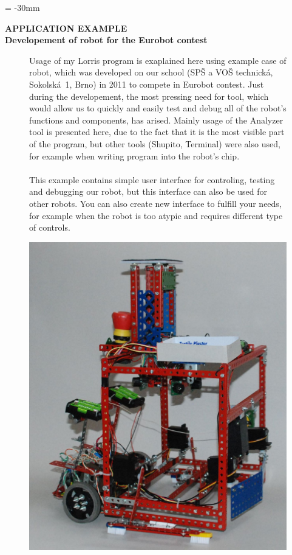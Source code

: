 \documentclass[17pt]{extreport}
\newcommand{\B}{\textbf} %
\begin{document}
\newpage
\voffset = -30mm %
\begin{center}
    \Large \B{APPLICATION EXAMPLE \\Developement of robot for the Eurobot contest}
\end{center}
\vspace{5mm}
\enlargethispage{200mm} %
\begin{figure}[ht]
    \begin{minipage}[t]{0.48\linewidth}
Usage of my Lorris program is exaplained here using example case of robot, which was developed on our school (SPŠ a VOŠ technická, Sokolská~1, Brno) in 2011 to compete in Eurobot contest. Just during the developement, the most pressing need for tool, which would allow us to quickly and easily test and debug all of the robot's functions and components, has arised. Mainly usage of the Analyzer tool is presented here, due to the fact that it is the most visible part of the program, but other tools (Shupito, Terminal) were also used, for example when writing program into the robot's chip. \\ \\
This example contains simple user interface for controling, testing and debugging our robot, but this interface can also be used for other robots. You can also create new interface to fulfill your needs, for example when the robot is too atypic and requires different type of controls.
    \end{minipage}
    \hfill
    \begin{minipage}[t]{0.50\linewidth}
        \vspace{0pt}
        \includegraphics[width=\linewidth]{img/robot.jpg}
    \end{minipage}
\end{figure}\\
\end{document}
